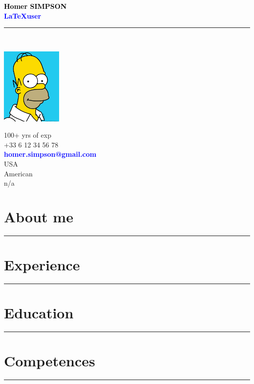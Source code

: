 \documentclass[11pt,A4]{article}
\begin{document}
\noindent\textcolor{black}{\large \bf Homer SIMPSON}\\
\textcolor{blue}{\large \bf \LaTeX \hspace{2mm}user }\vspace{5pt}\\
\noindent\textcolor{black}{\rule{\textwidth}{.8mm}}\\

\begin{minipage}[c]{0.3\textwidth}
\includegraphics[width=30mm]{photo}
\end{minipage}
\begin{minipage}[c]{0.35\textwidth}
\MineSign \hfill 100+ yrs of exp\\
\faPhone \hfill +33 6 12 34 56 78\\
\Letter \hfill \textcolor{blue}{\bf homer.simpson@gmail.com}\\
\faHome \hfill USA\\
\faFlag \hfill American\\
\faCar \hfill n/a\\
\end{minipage}

\section*{\hspace{0.5cm}About me}
\noindent\textcolor{black}{\rule{\textwidth}{.8mm}}
\lipsum[1]

\section*{\hspace{0.5cm}Experience}
\noindent\textcolor{black}{\rule{\textwidth}{.8mm}}
\lipsum[2]

\section*{\hspace{0.5cm}Education}
\noindent\textcolor{black}{\rule{\textwidth}{.8mm}}
\lipsum[3]

\section*{\hspace{0.5cm}Competences}
\noindent\textcolor{black}{\rule{\textwidth}{.8mm}}
\lipsum[4]
\end{document}
